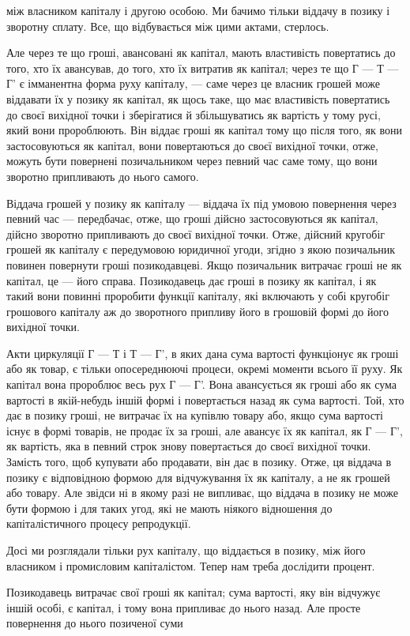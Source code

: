 \parcont{}  %
між власником капіталу і другою особою. Ми бачимо тільки
віддачу в позику і зворотну сплату. Все, що відбувається між
цими актами, стерлось.

Але через те що гроші, авансовані як капітал, мають властивість
повертатись до того, хто їх авансував, до того, хто
їх витратив як капітал; через те що Г — Т — Г' є імманентна форма
руху капіталу, — саме через це власник грошей може віддавати
їх у позику як капітал, як щось таке, що має властивість повертатись
до своєї вихідної точки і зберігатися й збільшуватись як
вартість у тому русі, який вони пророблюють. Він віддає гроші як
капітал тому що після того, як вони застосовуються як капітал,
вони повертаються до своєї вихідної точки, отже, можуть бути
повернені позичальником через певний час саме тому, що вони
зворотно припливають до нього самого.

Віддача грошей у позику як капіталу — віддача їх під умовою
повернення через певний час — передбачає, отже, що гроші
дійсно застосовуються як капітал, дійсно зворотно припливають
до своєї вихідної точки. Отже, дійсний кругобіг грошей
як капіталу є передумовою юридичної угоди, згідно з якою
позичальник повинен повернути гроші позикодавцеві. Якщо позичальник
витрачає гроші не як капітал, це — його справа. Позикодавець
дає гроші в позику як капітал, і як такий вони повинні
проробити функції капіталу, які включають у собі кругобіг грошового
капіталу аж до зворотного припливу його в грошовій
формі до його вихідної точки.

Акти циркуляції Г — Т і Т — Г', в яких дана сума вартості функціонує
як гроші або як товар, є тільки опосереднюючі процеси,
окремі моменти всього її руху. Як капітал вона пророблює весь
рух Г — Г'. Вона авансується як гроші або як сума вартості
в якій-небудь іншій формі і повертається назад як сума вартості.
Той, хто дає в позику гроші, не витрачає їх на купівлю товару
або, якщо сума вартості існує в формі товарів, не продає їх за
гроші, але авансує їх як капітал, як Г — Г', як вартість, яка
в певний строк знову повертається до своєї вихідної точки.
Замість того, щоб купувати або продавати, він дає в позику.
Отже, ця віддача в позику є відповідною формою для відчужування
їх як капіталу, а не як грошей або товару. Але звідси ні
в якому разі не випливає, що віддача в позику не може бути
формою і для таких угод, які не мають ніякого відношення до
капіталістичного процесу репродукції.

Досі ми розглядали тільки рух капіталу, що віддається в позику,
між його власником і промисловим капіталістом. Тепер
нам треба дослідити процент.

Позикодавець витрачає свої гроші як капітал; сума вартості,
яку він відчужує іншій особі, є капітал, і тому вона припливає
до нього назад. Але просте повернення до нього позиченої суми
\parbreak{}  %
